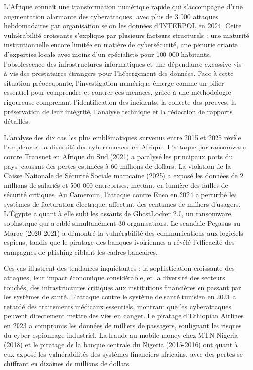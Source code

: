 \documentclass[12pt, a4paper]{article}
\begin{document}
		L'Afrique connaît une transformation numérique rapide qui s'accompagne d'une augmentation alarmante des cyberattaques, avec plus de 3 000 attaques hebdomadaires par organisation selon les données d'INTERPOL en 2024. Cette vulnérabilité croissante s'explique par plusieurs facteurs structurels : une maturité institutionnelle encore limitée en matière de cybersécurité, une pénurie criante d'expertise locale avec moins d'un spécialiste pour 100 000 habitants, l'obsolescence des infrastructures informatiques et une dépendance excessive vis-à-vis des prestataires étrangers pour l'hébergement des données. Face à cette situation préoccupante, l'investigation numérique émerge comme un pilier essentiel pour comprendre et contrer ces menaces, grâce à une méthodologie rigoureuse comprenant l'identification des incidents, la collecte des preuves, la préservation de leur intégrité, l'analyse technique et la rédaction de rapports détaillés.
		
		L'analyse des dix cas les plus emblématiques survenus entre 2015 et 2025 révèle l'ampleur et la diversité des cybermenaces en Afrique. L'attaque par ransomware contre Transnet en Afrique du Sud (2021) a paralysé les principaux ports du pays, causant des pertes estimées à 60 millions de dollars. La violation de la Caisse Nationale de Sécurité Sociale marocaine (2025) a exposé les données de 2 millions de salariés et 500 000 entreprises, mettant en lumière des failles de sécurité critiques. Au Cameroun, l'attaque contre Eneo en 2024 a perturbé les systèmes de facturation électrique, affectant des centaines de milliers d'usagers. L'Égypte a quant à elle subi les assauts de GhostLocker 2.0, un ransomware sophistiqué qui a ciblé simultanément 30 organisations. Le scandale Pegasus au Maroc (2020-2021) a démontré la vulnérabilité des communications aux logiciels espions, tandis que le piratage des banques ivoiriennes a révélé l'efficacité des campagnes de phishing ciblant les cadres bancaires.
		
		Ces cas illustrent des tendances inquiétantes : la sophistication croissante des attaques, leur impact économique considérable, et la diversité des secteurs touchés, des infrastructures critiques aux institutions financières en passant par les systèmes de santé. L'attaque contre le système de santé tunisien en 2021 a retardé des traitements médicaux essentiels, montrant que les cyberattaques peuvent directement mettre des vies en danger. Le piratage d'Ethiopian Airlines en 2023 a compromis les données de milliers de passagers, soulignant les risques du cyber-espionnage industriel. La fraude au mobile money chez MTN Nigeria (2018) et le piratage de la banque centrale du Nigeria (2015-2016) ont quant à eux exposé les vulnérabilités des systèmes financiers africains, avec des pertes se chiffrant en dizaines de millions de dollars.
		
\end{document}
